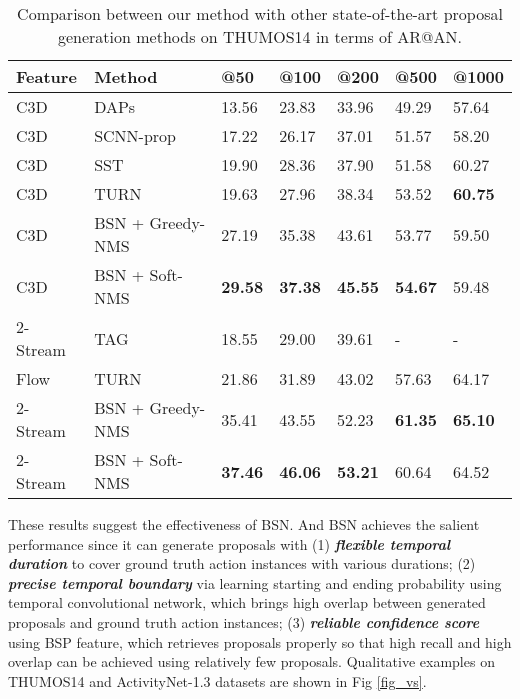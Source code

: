 \documentclass[runningheads]{llncs}
\begin{document}
\begin{table}[tbp]
\setlength{\abovecaptionskip}{-0.05cm} \setlength{\belowcaptionskip}{0.1cm} \centering
\caption{ Comparison between our method with other state-of-the-art  proposal generation methods on  THUMOS14 in terms of AR@AN.} \begin{tabular}{m{1.9cm}<{\centering}m{3.1cm}m{1.2cm}<{\centering}m{1.2cm}<{\centering}m{1.2cm}<{\centering}m{1.2cm}<{\centering}m{1.2cm}<{\centering}}
\toprule
Feature & Method  		& @50 & @100  & @200 & @500 & @1000    \\
\hline 
C3D & DAPs \cite{escorcia2016daps} 		& 13.56	& 23.83 &  33.96 & 49.29 & 57.64   \\
C3D & SCNN-prop \cite{shou2016action} 	& 17.22 & 26.17 &  37.01 & 51.57 & 58.20   \\
C3D & SST \cite{sst_buch_cvpr17}			& 19.90 & 28.36  &  37.90 & 51.58 & 60.27   \\
C3D & TURN \cite{gao2017turn} 			& 19.63 & 27.96 &  38.34 & 53.52 & {\bf 60.75}  \\
\hline 
C3D & BSN + Greedy-NMS 	& 27.19 & 35.38 &  43.61 &  53.77  & 59.50   \\
C3D & BSN + Soft-NMS	& {\bf 29.58} & {\bf 37.38} &  {\bf 45.55} & {\bf 54.67} & 59.48   \\
\hline 
\hline 
2-Stream & TAG \cite{zhao2017temporal} 		& 18.55 & 29.00  &  39.61 & - & -  \\
Flow & TURN \cite{gao2017turn} 		& 21.86 & 31.89 & 43.02 & 57.63  & 64.17  \\
\hline 
2-Stream & BSN + Greedy-NMS & 	 35.41 & 43.55 &  52.23 & {\bf 61.35} & {\bf 65.10 } \\
2-Stream & BSN + Soft-NMS & {\bf 37.46} & {\bf 46.06} &  {\bf 53.21} & 60.64 &  64.52   \\
\bottomrule
\end{tabular}
\label{table_comparison_2}
\vspace{-0.4cm}
\end{table}










These results suggest the effectiveness of BSN. And BSN achieves the salient performance since it can generate proposals with (1) {\bf \emph{flexible temporal duration}} to cover ground truth action instances with various durations; (2) {\bf \emph{precise temporal boundary}} via learning starting and ending probability using temporal convolutional network, which brings high overlap between generated proposals and ground truth action instances; (3) {\bf \emph{reliable confidence score}} using BSP feature, which retrieves proposals properly so that high recall and high overlap can be achieved using relatively few proposals.
Qualitative examples on  THUMOS14 and ActivityNet-1.3 datasets are shown in Fig \ref{fig_vs}.
\end{document}

